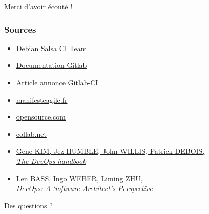 \documentclass[10pt]{beamer}
\begin{document}
	\begin{appendix}

		\begin{frame}[standout]
			Merci d'avoir écouté !
		\end{frame}

		\begin{frame}
			\frametitle{Sources}
			\begin{itemize}
				\item \href{https://salsa.debian.org/salsa-ci-team/pipeline}{Debian Salsa CI Team}
				\item \href{https://docs.gitlab.com/ee/ci/}{Documentation Gitlab}

				\item \href{https://about.gitlab.com/press/releases/2018-03-22-gitlab-cicd-github-integration.html}{Article annonce Gitlab-CI}
				\item \href{http://manifesteagile.fr/}{manifesteagile.fr}
				\item \href{https://opensource.com/article/17/11/5-keys-get-started-devops}{opensource.com}
				\item \href{https://resources.collab.net/devops-101/what-is-devops}{collab.net}

				\item \href{https://itrevolution.com/book/the-devops-handbook/}{Gene KIM, Jez HUMBLE, John WILLIS, Patrick DEBOIS,\\ \textit{The DevOps handbook}}
				\item \href{https://itrevolution.com/book/the-devops-handbook/}{Len BASS, Ingo WEBER, Liming ZHU,\\ \textit{DevOps: A Software Architect’s Perspective}}
			\end{itemize}
		\end{frame}

		\begin{frame}[standout]
			Des questions ?
		\end{frame}

	\end{appendix}
	\maketitle
\end{document}
